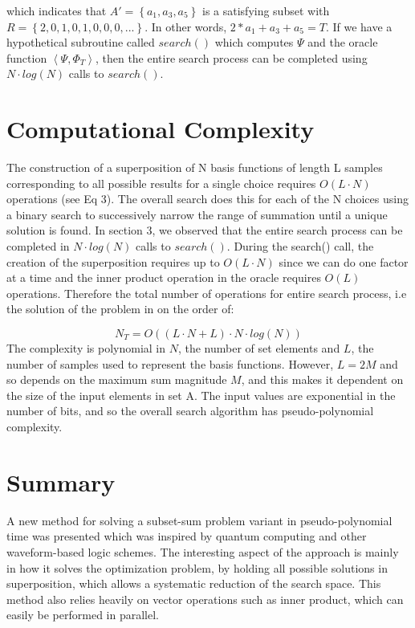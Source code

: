 \documentclass[reqno]{amsart}
\theoremstyle{definition}
\theoremstyle{remark}
\begin{document}
\noindent
which indicates that $A'= \left\{a_1, a_3, a_5 \right\}$ is a satisfying subset with $R = \left\{2,0,1,0,1,0,0,0,...\right\}$. 
In other words, $2*a_1 + a_3 + a_5 = T $. If we have a hypothetical subroutine called $search()$ which computes $\Psi$ and the oracle function
$\left \langle  \Psi, \Phi _T  \right \rangle $, then the entire search process can be completed using $N\cdot log(N)$ calls to $search()$.




\section{Computational Complexity}
The construction of a superposition of N basis functions of length L samples corresponding to all possible results for a single choice requires $O(L\cdot N)$ operations (see Eq 3).  The overall search does this for each of the N choices using a binary search to successively narrow the range of summation until a unique solution is found. In section 3, we observed that the entire search process can be completed in $N\cdot log(N)$ calls to $search()$. During the search() call, the creation of the superposition requires up to $O(L\cdot N)$ since we can do one factor at a time and the inner product operation in the oracle requires $O(L)$ operations. Therefore the total number of operations for entire search process, i.e the solution of the problem in on the order of:

\begin{equation}
N_T = O( (L \cdot N + L) \cdot N\cdot log(N) )
\end{equation}
\noindent
The complexity is polynomial in $N$, the number of set elements and $L$, the number of samples used to represent the basis functions. However, $L = 2M$ and so depends on the maximum sum magnitude $M$, and this makes it dependent on the size of the input elements in set A. The input values are exponential in the number of bits, and so the overall search algorithm has pseudo-polynomial complexity.


\newpage
\section{Summary}
A new method for solving a subset-sum problem variant in pseudo-polynomial time was presented which was inspired by quantum computing and other waveform-based logic schemes. The interesting aspect of the approach is mainly in how it solves the optimization problem, by holding all possible solutions in superposition, which allows a systematic reduction of the search space. This method also relies heavily on vector operations such as inner product, which can easily be performed in parallel.
\end{document}
